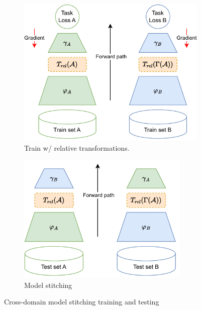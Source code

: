 \documentclass[../main.tex]{subfiles}
\begin{document}
\begin{figure}[ht!]
     \centering
    \begin{subfigure}[b]{0.45\textwidth}
         \centering
         \includegraphics[width=\textwidth]{figures/bg/relativeTrainScheme.pdf}
        \caption{Train w/ relative transformations.}
         \label{fig:relTrainScheme_intro}
     \end{subfigure}\hfill
      \begin{subfigure}[b]{0.45\textwidth}
         \centering
         \includegraphics[width=0.9\textwidth]{figures/bg/relativeStitchScheme.pdf}
        \caption{Model stitching}
         \label{fig:relStitchScheme_intro}
     \end{subfigure}
    \caption{Cross-domain model stitching training and testing}
    \label{fig:crossDomainScheme_intro}
\end{figure}
\end{document}
